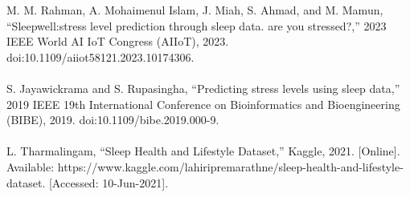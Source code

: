 \documentclass[11pt, letterpaper]{article}
\begin{document}
    \newpage
    \begin{thebibliography}{9}
         M. M. Rahman, A. Mohaimenul Islam, J. Miah, S. Ahmad, and M. Mamun, “Sleepwell:stress level prediction through sleep data. are you stressed?,” 2023 IEEE World AI IoT Congress (AIIoT), 2023. doi:10.1109/aiiot58121.2023.10174306.\\\\

         S. Jayawickrama and S. Rupasingha, “Predicting stress levels using sleep data,” 2019 IEEE 19th International Conference on Bioinformatics and Bioengineering (BIBE), 2019. doi:10.1109/bibe.2019.000-9.\\\\

         L. Tharmalingam, “Sleep Health and Lifestyle Dataset,” Kaggle, 2021. [Online]. Available: https://www.kaggle.com/lahiripremarathne/sleep-health-and-lifestyle-dataset. [Accessed: 10-Jun-2021].\\

    \end{thebibliography}
\end{document}
